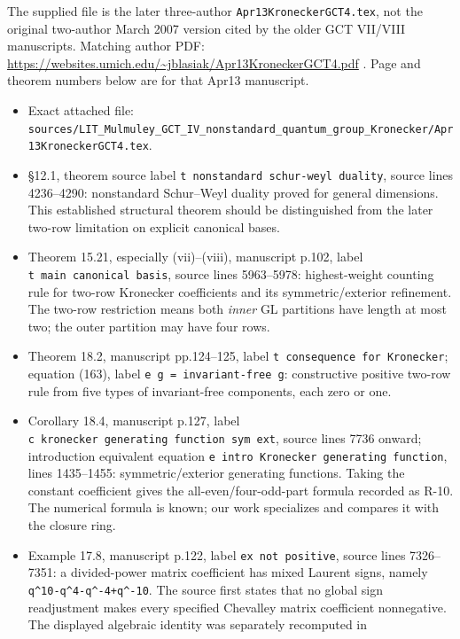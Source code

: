 \documentclass[11pt,a4paper]{article}
\providecommand{\tightlist}{\setlength{\itemsep}{0pt}\setlength{\parskip}{0pt}}
\theoremstyle{definition}\newtheorem{definition}{Definition}
\begin{document}
The supplied file is the later three-author
\nolinkurl{Apr13KroneckerGCT4.tex}, not the original two-author March 2007
version cited by the older GCT VII/VIII manuscripts. Matching author
PDF: \url{https://websites.umich.edu/~jblasiak/Apr13KroneckerGCT4.pdf} .
Page and theorem numbers below are for that Apr13 manuscript.

\begin{itemize}
\tightlist
\item
  Exact attached file:
  \nolinkurl{sources/LIT_Mulmuley_GCT_IV_nonstandard_quantum_group_Kronecker/Apr13KroneckerGCT4.tex}.
\item
  §12.1, theorem source label
  \texttt{t\ nonstandard\ schur-weyl\ duality}, source lines 4236--4290:
  nonstandard Schur--Weyl duality proved for general dimensions. This
  established structural theorem should be distinguished from the later
  two-row limitation on explicit canonical bases.
\item
  Theorem 15.21, especially (vii)--(viii), manuscript p.102, label
  \texttt{t\ main\ canonical\ basis}, source lines 5963--5978:
  highest-weight counting rule for two-row Kronecker coefficients and
  its symmetric/exterior refinement. The two-row restriction means both
  \emph{inner} GL partitions have length at most two; the outer
  partition may have four rows.
\item
  Theorem 18.2, manuscript pp.124--125, label
  \texttt{t\ consequence\ for\ Kronecker}; equation (163), label
  \texttt{e\ g\ =\ invariant-free\ g}: constructive positive two-row
  rule from five types of invariant-free components, each zero or one.
\item
  Corollary 18.4, manuscript p.127, label
  \texttt{c\ kronecker\ generating\ function\ sym\ ext}, source lines
  7736 onward; introduction equivalent equation
  \texttt{e\ intro\ Kronecker\ generating\ function}, lines 1435--1455:
  symmetric/exterior generating functions. Taking the constant
  coefficient gives the all-even/four-odd-part formula recorded as R-10.
  The numerical formula is known; our work specializes and compares it
  with the closure ring.
\item
  Example 17.8, manuscript p.122, label \texttt{ex\ not\ positive},
  source lines 7326--7351: a divided-power matrix coefficient has mixed
  Laurent signs, namely \texttt{q\^{}10-q\^{}4-q\^{}-4+q\^{}-10}. The
  source first states that no global sign readjustment makes every
  specified Chevalley matrix coefficient nonnegative. The displayed
  algebraic identity was separately recomputed in

\end{itemize}
\end{document}
